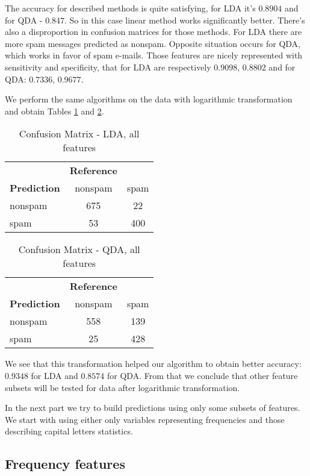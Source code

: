 \documentclass[12pt, letter paper]{article}
\begin{document}
	The accuracy for described methods is quite satisfying, for LDA it's $0.8904$ and for QDA - $0.847$. So in this case linear method works significantly better. There's also a disproportion in confusion matrices for those methods. For LDA there are more spam messages predicted as nonspam. Opposite situation occurs for QDA, which works in favor of spam e-mails. Those features are nicely represented with sensitivity and specificity, that for LDA are respectively $0.9098$, $0.8802$ and for QDA: $0.7336$, $0.9677$. 
	
	We perform the same algorithms on the data with logarithmic transformation and obtain Tables \ref{tab:confusion_matrix_lda1_log} and \ref{tab:confusion_matrix_qda1_log}.
	
	\begin{table}[h]
		\centering
		\begin{tabular}{lcc}
			& \textbf{Reference} & \\
			\textbf{Prediction} & nonspam & spam \\
			nonspam & 675 & 22 \\
			spam & 53 & 400 \\
		\end{tabular}
		\caption{Confusion Matrix - LDA, all features}
		\label{tab:confusion_matrix_lda1_log}
	\end{table}
	
	\begin{table}[h]
		\centering
		\begin{tabular}{lcc}
			& \textbf{Reference} & \\
			\textbf{Prediction} & nonspam & spam \\
			nonspam & 558 & 139 \\
			spam & 25 & 428 \\
		\end{tabular}
		\caption{Confusion Matrix - QDA, all features}
		\label{tab:confusion_matrix_qda1_log}
	\end{table}
	
	We see that this transformation helped our algorithm to obtain better accuracy: $0.9348$ for LDA and $0.8574$ for QDA. From that we conclude that other feature subsets will be tested for data after logarithmic transformation.
	
	In the next part we try to build predictions using only some subsets of features. We start with using either only variables representing frequencies and those describing capital letters statistics.
	
	\subsection*{Frequency features}
	
\end{document}
